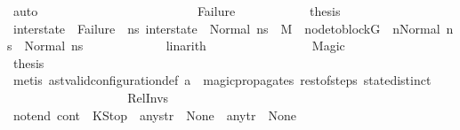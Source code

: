 \begin{isabellebody}
\ auto\isanewline
\ \ \ \ \ \ \ \ \isamarkupfalse%
\isanewline
\ \ \ \ \ \ \isamarkupfalse%
\isanewline
\ \ \ \ \ \ \ \ \isamarkupfalse%
\ Failure\isanewline
\ \ \ \ \ \ \ \ \isamarkupfalse%
\ \isamarkupfalse%
\ {\isacharquery}{\kern0pt}thesis\isanewline
\ \ \ \ \ \ \ \ \ \ \isamarkupfalse%
\ {\isacartoucheopen}inter{\isacharunderscore}{\kern0pt}state\ {\isasymnoteq}\ Failure\ {\isasymand}\ {\isacharparenleft}{\kern0pt}{\isasymforall}ns{}{\isacharprime}{\kern0pt}{\isachardot}{\kern0pt}\ inter{\isacharunderscore}{\kern0pt}state\ {\isacharequal}{\kern0pt}\ Normal\ ns{}{\isacharprime}{\kern0pt}\ {\isasymlongrightarrow}\ M{\isacharcomma}{\kern0pt}{\isasymLambda}{\isacharcomma}{\kern0pt}{\isasymGamma}{\isacharcomma}{\kern0pt}{\isasymOmega}\ {\isasymturnstile}\ {\isasymlangle}node{\isacharunderscore}{\kern0pt}to{\isacharunderscore}{\kern0pt}block{\isacharparenleft}{\kern0pt}G{\isacharparenright}{\kern0pt}\ {\isacharbang}{\kern0pt}\ n{\isacharcomma}{\kern0pt}Normal\ ns{}{\isasymrangle}\ {\isacharbrackleft}{\kern0pt}{\isasymrightarrow}{\isacharbrackright}{\kern0pt}\ Normal\ ns{}{\isacharprime}{\kern0pt}{\isacharparenright}{\kern0pt}{\isacartoucheclose}\ \isanewline
\ \ \ \ \ \ \ \ \ \ \isamarkupfalse%
\ linarith\isanewline
\ \ \ \ \ \ \isamarkupfalse%
\isanewline
\ \ \ \ \ \ \ \ \isamarkupfalse%
\ Magic\isanewline
\ \ \ \ \ \ \ \ \isamarkupfalse%
\ \isamarkupfalse%
\ {\isacharquery}{\kern0pt}thesis\ \isamarkupfalse%
\ {\isacharparenleft}{\kern0pt}metis\ ast{\isacharunderscore}{\kern0pt}valid{\isacharunderscore}{\kern0pt}configuration{\isacharunderscore}{\kern0pt}def\ a{}\ \ magic{\isacharunderscore}{\kern0pt}propagates\ rest{\isacharunderscore}{\kern0pt}of{\isacharunderscore}{\kern0pt}steps\ state{\isachardot}{\kern0pt}distinct{\isacharparenleft}{\kern0pt}{}{\isacharparenright}{\kern0pt}{\isacharparenright}{\kern0pt}\isanewline
\ \ \ \ \ \ \isamarkupfalse%
\isanewline
\ \ \ \ \isamarkupfalse%
\ \isanewline
\ \ \isamarkupfalse%
\isanewline
{}\isamarkupfalse%
\isanewline
\ \ \isamarkupfalse%
\ Rel{\isacharunderscore}{\kern0pt}Invs\isanewline
\ \ \isamarkupfalse%
\ not{\isacharunderscore}{\kern0pt}end{\isacharcolon}{\kern0pt}\ {\isachardoublequoteopen}{\isacharparenleft}{\kern0pt}cont{}\ {\isasymnoteq}\ KStop{\isacharparenright}{\kern0pt}\ {\isasymor}\ any{\isacharunderscore}{\kern0pt}str\ {\isasymnoteq}\ None\ {\isasymor}\ any{\isacharunderscore}{\kern0pt}tr\ {\isasymnoteq}\ None{\isachardoublequoteclose}\ \isamarkupfalse%

\end{isabellebody}
